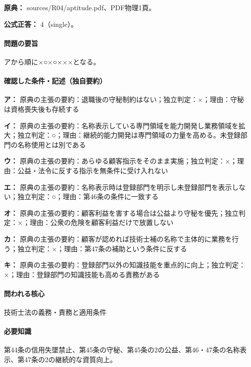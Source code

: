 \noindent\textbf{原典：} sources/R04/aptitude.pdf、PDF物理1頁。

\textbf{公式正答：} 4（single）。

\paragraph{問題の要旨} アから順に×○×○×××となる。

\paragraph{確認した条件・記述（独自要約）}\mbox{}\par

\noindent\textbf{ア：} 原典の主張の要約：退職後の守秘制約はない；独立判定：×；理由：守秘は資格喪失後も存続する\par

\noindent\textbf{イ：} 原典の主張の要約：名称表示している専門領域を能力開発し業務領域を拡大；独立判定：○；理由：継続的能力開発は専門領域の力量を高める。未登録部門の名称使用とは別である\par

\noindent\textbf{ウ：} 原典の主張の要約：あらゆる顧客指示をそのまま実施；独立判定：×；理由：公益・法令に反する指示を無条件に受け入れない\par

\noindent\textbf{エ：} 原典の主張の要約：名称表示時は登録部門を明示し未登録部門を表示しない；独立判定：○；理由：第46条の条件に一致する\par

\noindent\textbf{オ：} 原典の主張の要約：顧客利益を害する場合は公益より守秘を優先；独立判定：×；理由：公衆の危険を顧客利益だけで放置しない\par

\noindent\textbf{カ：} 原典の主張の要約：顧客が認めれば技術士補の名称で主体的に業務を行う；独立判定：×；理由：第47条の補助という条件に反する\par

\noindent\textbf{キ：} 原典の主張の要約：登録部門以外の知識技能を重点的に向上；独立判定：×；理由：登録部門の知識技能も高める責務がある\par

\paragraph{問われる核心} 技術士法の義務・責務と適用条件

\paragraph{必要知識} 第44条の信用失墜禁止、第45条の守秘、第45条の2の公益、第46・47条の名称表示、第47条の2の継続的な資質向上。

